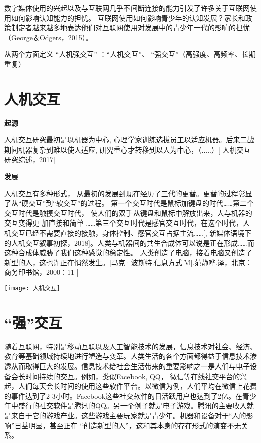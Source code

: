 \color{blue}


数字媒体使用的兴起以及与互联网几乎不间断连接的能力引发了许多关于互联网使用如何影响认知能力的担忧。 
互联网使用如何影响青少年的认知发展？家长和政策制定者越来越多地表达他们对互联网使用对发展中的青少年一代的影响的担忧（George＆Odgers，2015）。

从两个方面定义 “人机强交互” ：“人机交互”、 “强交互”（高强度、高频率、长期重复）

\section{人机交互}
\textbf{起源}

人机交互研究最初是以机器为中心, 心理学家训练选拔员工以适应机器。后来二战期间机器复杂到难以使人适应, 研究重心才转移到以人为中心，（.....）[\cite{} 人机交互研究综述，2017]

{\textbf 发展}

人机交互有多种形式， 从最初的发展到现在经历了三代的更替。更替的过程彰显了从“硬交互”到“软交互”的过程。 第一个交互时代是鼠标加键盘的时代……第二个交互时代是触摸交互时代， 使人们的双手从键盘和鼠标中解放出来，人与机器的交互变得更 加直接和简单 ……第三个交互时代是感官交互时代，在这个时代，人机交互已经不需要直接的接触，身体控制、感官交互占据主流……[\cite{}, 新媒体语境下的人机交互叙事初探，2018]。人类与机器间的共生合成体可以说是正在形成……而这种合成体威胁了我们这种感觉的稳定性。 人类创造了电脑，接着电脑又创造了新型的人，这也许正在悄然发生。[\cite{}马克·波斯特.信息方式[M].范静哗.译，北京：商务印书馆，2000：11 ]


\texttt{[image: 人机交互]}


\section{“强”交互}


随着互联网，特别是移动互联以及人工智能技术的发展，信息技术对社会、经济、教育等基础领域持续地进行塑造与变革。人类生活的各个方面都得益于信息技术渗透从而取得巨大的发展。信息技术给社会生活带来的重要影响之一是人们与电子设备会长时间持续的交互。例如，类似Facebook, QQ， 微信等在线社交平台的兴起，人们每天会长时间的使用这些软件平台。以微信为例，人们平均在微信上花费的事件达到了2-3小时。Facebook这些社交软件的日活跃用户也达到了2亿。在青少年中盛行的社交软件是腾讯的QQ。另一个例子就是电子游戏。腾讯的主要收入就是来自于它的游戏产业。这些游戏主要玩家就是青少年。机器和设备对于“人的影响”日益明显，甚至正在 “创造新型的人”，这和其本身的存在形式的演变不无关系。


